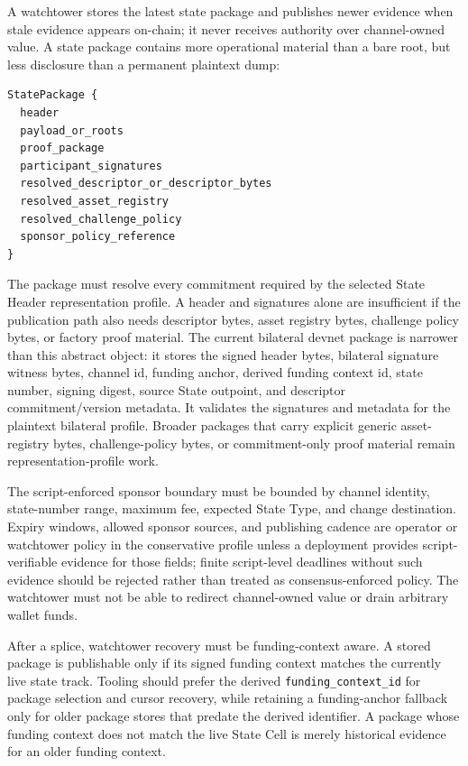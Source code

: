 \documentclass[a4paper,11pt]{article}
\begin{document}
A watchtower stores the latest state package and publishes newer evidence when stale evidence appears on-chain; it never receives authority over channel-owned value. A state package contains more operational material than a bare root, but less disclosure than a permanent plaintext dump:
\begin{lstlisting}
StatePackage {
  header
  payload_or_roots
  proof_package
  participant_signatures
  resolved_descriptor_or_descriptor_bytes
  resolved_asset_registry
  resolved_challenge_policy
  sponsor_policy_reference
}
\end{lstlisting}
The package must resolve every commitment required by the selected State Header
representation profile. A header and signatures alone are insufficient if the
publication path also needs descriptor bytes, asset registry bytes, challenge
policy bytes, or factory proof material.
The current bilateral devnet package is narrower than this abstract object: it
stores the signed header bytes, bilateral signature witness bytes, channel id,
funding anchor, derived funding context id, state number, signing digest,
source State outpoint, and descriptor commitment/version metadata. It validates
the signatures and metadata for the plaintext bilateral profile. Broader
packages that carry explicit generic asset-registry bytes, challenge-policy
bytes, or commitment-only proof material remain representation-profile work.

The script-enforced sponsor boundary must be bounded by channel identity, state-number range, maximum fee, expected State Type, and change destination. Expiry windows, allowed sponsor sources, and publishing cadence are operator or watchtower policy in the conservative profile unless a deployment provides script-verifiable evidence for those fields; finite script-level deadlines without such evidence should be rejected rather than treated as consensus-enforced policy. The watchtower must not be able to redirect channel-owned value or drain arbitrary wallet funds.

After a splice, watchtower recovery must be funding-context aware. A stored package is publishable only if its signed funding context matches the currently live state track. Tooling should prefer the derived \texttt{funding\_context\_id} for package selection and cursor recovery, while retaining a funding-anchor fallback only for older package stores that predate the derived identifier. A package whose funding context does not match the live State Cell is merely historical evidence for an older funding context.
\end{document}
